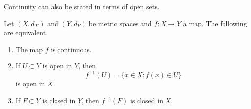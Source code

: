 Continuity can also be stated in terms of open sets.

\begin{theorem} \label{thm:continuity_and_open_sets}
Let $(X,d_X)$ and $(Y,d_Y)$ be metric spaces and $f : X \to Y$ a map.
The following are equivalent.
\begin{enumerate}
\item \label{item3.1.2.i} The map $f$ is continuous.
\item \label{item3.1.2.ii} If $U \subset Y$ is open in $Y$, then
\[
f^{-1}(U) = \{x \in X: f(x) \in U\}
\]
is open in $X$.
\item \label{item3.1.2.iii} If $F \subset Y$ is closed in $Y$, then $f^{-1}(F)$ is closed in $X$.
\end{enumerate}
\end{theorem}

